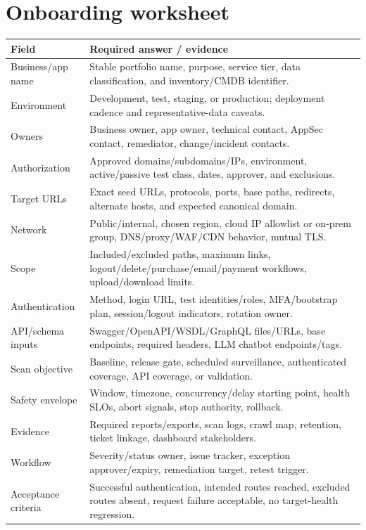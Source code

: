 \documentclass[11pt,letterpaper,oneside]{scrreprt}
\begin{document}
\section{Onboarding worksheet}\label{sec:onboarding-worksheet}
\begin{longtable}{@{}P{1.8in}P{4.8in}@{}}
\toprule
\textbf{Field} & \textbf{Required answer / evidence}\\
\midrule
\endhead
Business/app name & Stable portfolio name, purpose, service tier, data classification, and inventory/CMDB identifier.\\
Environment & Development, test, staging, or production; deployment cadence and representative-data caveats.\\
Owners & Business owner, app owner, technical contact, AppSec contact, remediator, change/incident contacts.\\
Authorization & Approved domains/subdomains/IPs, environment, active/passive test class, dates, approver, and exclusions.\\
Target URLs & Exact seed URLs, protocols, ports, base paths, redirects, alternate hosts, and expected canonical domain.\\
Network & Public/internal, chosen region, cloud IP allowlist or on-prem group, DNS/proxy/WAF/CDN behavior, mutual TLS.\\
Scope & Included/excluded paths, maximum links, logout/delete/purchase/email/payment workflows, upload/download limits.\\
Authentication & Method, login URL, test identities/roles, MFA/bootstrap plan, session/logout indicators, rotation owner.\\
API/schema inputs & Swagger/OpenAPI/WSDL/GraphQL files/URLs, base endpoints, required headers, LLM chatbot endpoints/tags.\\
Scan objective & Baseline, release gate, scheduled surveillance, authenticated coverage, API coverage, or validation.\\
Safety envelope & Window, timezone, concurrency/delay starting point, health SLOs, abort signals, stop authority, rollback.\\
Evidence & Required reports/exports, scan logs, crawl map, retention, ticket linkage, dashboard stakeholders.\\
Workflow & Severity/status owner, issue tracker, exception approver/expiry, remediation target, retest trigger.\\
Acceptance criteria & Successful authentication, intended routes reached, excluded routes absent, request failure acceptable, no target-health regression.\\
\bottomrule
\end{longtable}
\end{document}
